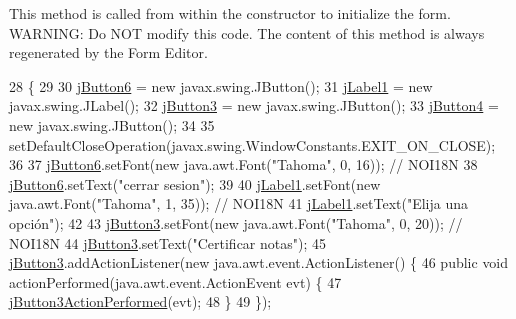 This method is called from within the constructor to initialize the form. W\+A\+R\+N\+I\+NG\+: Do N\+OT modify this code. The content of this method is always regenerated by the Form Editor. 
\begin{DoxyCode}
28                                   \{
29 
30         \mbox{\hyperlink{classsoftware_1_1elegirprof_a230246a01ebe054fe6b990811ba3c403}{jButton6}} = \textcolor{keyword}{new} javax.swing.JButton();
31         \mbox{\hyperlink{classsoftware_1_1elegirprof_a922b779cc2161f5cc8f9f4bff21fb1db}{jLabel1}} = \textcolor{keyword}{new} javax.swing.JLabel();
32         \mbox{\hyperlink{classsoftware_1_1elegirprof_af66925a660384d3f86f5cb3459c9acd0}{jButton3}} = \textcolor{keyword}{new} javax.swing.JButton();
33         \mbox{\hyperlink{classsoftware_1_1elegirprof_a9b56596496adced58249f364ee8944b2}{jButton4}} = \textcolor{keyword}{new} javax.swing.JButton();
34 
35         setDefaultCloseOperation(javax.swing.WindowConstants.EXIT\_ON\_CLOSE);
36 
37         \mbox{\hyperlink{classsoftware_1_1elegirprof_a230246a01ebe054fe6b990811ba3c403}{jButton6}}.setFont(\textcolor{keyword}{new} java.awt.Font(\textcolor{stringliteral}{"Tahoma"}, 0, 16)); \textcolor{comment}{// NOI18N}
38         \mbox{\hyperlink{classsoftware_1_1elegirprof_a230246a01ebe054fe6b990811ba3c403}{jButton6}}.setText(\textcolor{stringliteral}{"cerrar sesion"});
39 
40         \mbox{\hyperlink{classsoftware_1_1elegirprof_a922b779cc2161f5cc8f9f4bff21fb1db}{jLabel1}}.setFont(\textcolor{keyword}{new} java.awt.Font(\textcolor{stringliteral}{"Tahoma"}, 1, 35)); \textcolor{comment}{// NOI18N}
41         \mbox{\hyperlink{classsoftware_1_1elegirprof_a922b779cc2161f5cc8f9f4bff21fb1db}{jLabel1}}.setText(\textcolor{stringliteral}{"Elija una opción"});
42 
43         \mbox{\hyperlink{classsoftware_1_1elegirprof_af66925a660384d3f86f5cb3459c9acd0}{jButton3}}.setFont(\textcolor{keyword}{new} java.awt.Font(\textcolor{stringliteral}{"Tahoma"}, 0, 20)); \textcolor{comment}{// NOI18N}
44         \mbox{\hyperlink{classsoftware_1_1elegirprof_af66925a660384d3f86f5cb3459c9acd0}{jButton3}}.setText(\textcolor{stringliteral}{"Certificar notas"});
45         \mbox{\hyperlink{classsoftware_1_1elegirprof_af66925a660384d3f86f5cb3459c9acd0}{jButton3}}.addActionListener(\textcolor{keyword}{new} java.awt.event.ActionListener() \{
46             \textcolor{keyword}{public} \textcolor{keywordtype}{void} actionPerformed(java.awt.event.ActionEvent evt) \{
47                 \mbox{\hyperlink{classsoftware_1_1elegirprof_a4e181a30f97bb3098d2c1c9ef3fb26a4}{jButton3ActionPerformed}}(evt);
48             \}
49         \});

\end{DoxyCode}
